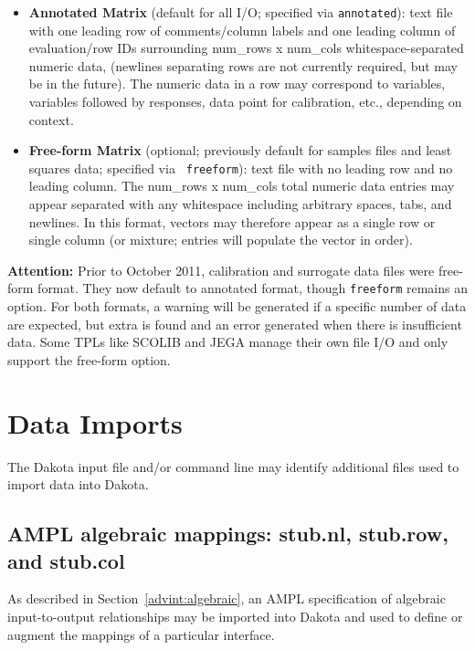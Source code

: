 \begin{itemize}
  \item {\bf Annotated Matrix} (default for all I/O; specified via
    {\tt annotated}): text file with one leading row of comments/column
    labels and one leading column of evaluation/row IDs surrounding
    num\_rows x num\_cols whitespace-separated numeric data, (newlines
    separating rows are not currently required, but may be in the
    future).  The numeric data in a row may correspond to variables,
    variables followed by responses, data point for calibration, etc.,
    depending on context.

   \item {\bf Free-form Matrix} (optional; previously default for
     samples files and least squares data; specified via {\tt
       freeform}): text file with no leading row and no leading
     column.  The num\_rows x num\_cols total numeric data entries may
     appear separated with any whitespace including arbitrary spaces,
     tabs, and newlines.  In this format, vectors may therefore appear
     as a single row or single column (or mixture; entries will
     populate the vector in order).
\end{itemize}

{\bf Attention:} Prior to October 2011, calibration and surrogate data
files were free-form format.  They now default to annotated format,
though {\tt freeform} remains an option.  For both formats, a warning
will be generated if a specific number of data are expected, but extra
is found and an error generated when there is insufficient data.  Some
TPLs like SCOLIB and JEGA manage their own file I/O and only support
the free-form option.

\section{Data Imports}\label{input:import}

The Dakota input file and/or command line may identify additional
files used to import data into Dakota.

\subsection{AMPL algebraic mappings: stub.nl, stub.row, and stub.col}

As described in Section~\ref{advint:algebraic}, an AMPL
specification of algebraic input-to-output relationships may be
imported into Dakota and used to define or augment the mappings of a
particular interface.


